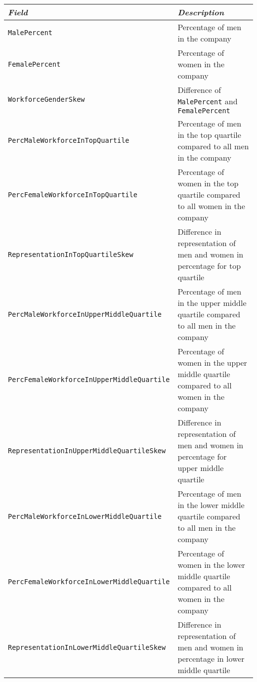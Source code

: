 \begin{centering}
    \scriptsize{
    \label{tab:additional-fields}
    \begin{tabular}{|l|p{9cm}|}\hline 
        \emph{Field} & \emph{Description} \\ \hline
        \texttt{MalePercent} &  Percentage of men in the company \\ \hline
        \texttt{FemalePercent} & Percentage of women in the company\\ \hline
        \texttt{WorkforceGenderSkew} & Difference of \texttt{MalePercent} and \texttt{FemalePercent} \\ \hline
        \texttt{PercMaleWorkforceInTopQuartile} & Percentage of men in the top quartile compared to all men in the company\\ \hline
        \texttt{PercFemaleWorkforceInTopQuartile} & Percentage of women in the top quartile compared to all women in the company\\ \hline
        \texttt{RepresentationInTopQuartileSkew} & Difference in representation of men and women in percentage for top quartile\\ \hline
        
        \texttt{PercMaleWorkforceInUpperMiddleQuartile} & Percentage of men in the upper middle quartile compared to all men in the company\\ \hline
        \texttt{PercFemaleWorkforceInUpperMiddleQuartile} & Percentage of women in the upper middle quartile compared to all women in the company\\ \hline
        \texttt{RepresentationInUpperMiddleQuartileSkew} & Difference in representation of men and women in percentage for upper middle quartile\\ \hline
        
        \texttt{PercMaleWorkforceInLowerMiddleQuartile} & Percentage of men in the lower middle quartile compared to all men in the company\\ \hline
        \texttt{PercFemaleWorkforceInLowerMiddleQuartile} & Percentage of women in the lower middle quartile compared to all women in the company\\ \hline
        \texttt{RepresentationInLowerMiddleQuartileSkew} & Difference in representation of men and women in percentage in lower middle quartile\\ \hline
        

\end{tabular}}
\end{centering}
